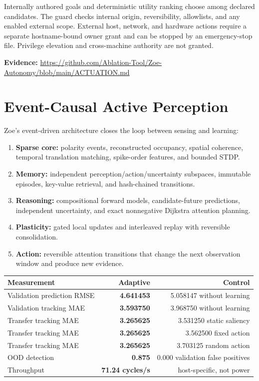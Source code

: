 \documentclass[11pt]{article}
\newcommand{\evidence}[1]{\par\smallskip\small\color{ZoeGray}\textbf{Evidence:} #1\normalsize\par\smallskip}
\begin{document}
Internally authored goals and deterministic utility ranking choose among declared candidates. The guard checks internal origin, reversibility, allowlists, and any enabled external scope. External host, network, and hardware actions require a separate hostname-bound owner grant and can be stopped by an emergency-stop file. Privilege elevation and cross-machine authority are not granted.

\evidence{\url{https://github.com/Ablation-Tool/Zoe-Autonomy/blob/main/ACTUATION.md}}

\clearpage
\section{Event-Causal Active Perception}

Zoe's event-driven architecture closes the loop between sensing and learning:
\begin{enumerate}
  \item \textbf{Sparse core:} polarity events, reconstructed occupancy, spatial coherence, temporal translation matching, spike-order features, and bounded STDP.
  \item \textbf{Memory:} independent perception/action/uncertainty subspaces, immutable episodes, key-value retrieval, and hash-chained transitions.
  \item \textbf{Reasoning:} compositional forward models, candidate-future predictions, independent uncertainty, and exact nonnegative Dijkstra attention planning.
  \item \textbf{Plasticity:} gated local updates and interleaved replay with reversible consolidation.
  \item \textbf{Action:} reversible attention transitions that change the next observation window and produce new evidence.
\end{enumerate}

\begin{center}
\begin{tabular}{lrr}
\toprule
\textbf{Measurement} & \textbf{Adaptive} & \textbf{Control}\\
\midrule
Validation prediction RMSE & \textbf{4.641453} & 5.058147 without learning\\
Validation tracking MAE & \textbf{3.593750} & 3.968750 without learning\\
Transfer tracking MAE & \textbf{3.265625} & 3.531250 static saliency\\
Transfer tracking MAE & \textbf{3.265625} & 3.562500 fixed action\\
Transfer tracking MAE & \textbf{3.265625} & 3.703125 random action\\
OOD detection & \textbf{0.875} & 0.000 validation false positives\\
Throughput & \textbf{71.24 cycles/s} & host-specific, not power\\
\bottomrule
\end{tabular}
\end{center}
\end{document}
